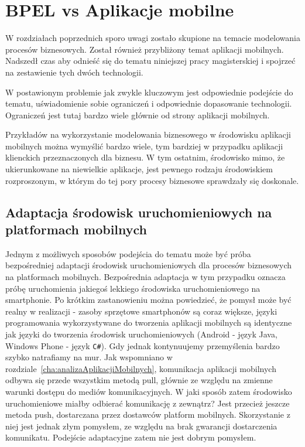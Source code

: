 \chapter{BPEL vs Aplikacje mobilne}
\label{cha:bpelVSmobileApp}

W rozdziałach poprzednich sporo uwagi zostało skupione na temacie modelowania procesów biznesowych. Został również przybliżony temat aplikacji mobilnych. Nadszedł czas aby odnieść się do tematu niniejszej pracy magisterskiej i spojrzeć na zestawienie tych dwóch technologii. 

W postawionym problemie jak zwykle kluczowym jest odpowiednie podejście do tematu, uświadomienie sobie ograniczeń i odpowiednie dopasowanie technologii. Ograniczeń jest tutaj bardzo wiele głównie od strony aplikacji mobilnych.

 Przykładów na wykorzystanie modelowania biznesowego w środowisku aplikacji mobilnych można wymyślić bardzo wiele, tym bardziej w przypadku aplikacji klienckich przeznaczonych dla biznesu. W tym ostatnim, środowisko mimo, że ukierunkowane na niewielkie aplikacje, jest pewnego rodzaju środowiskiem rozproszonym, w którym do tej pory procesy biznesowe sprawdzały się doskonale. 

\section{Adaptacja środowisk uruchomieniowych na platformach mobilnych}
\label{sec:adaptacjaProcesówNaPlatformyMobilne}

Jednym z możliwych sposobów podejścia do tematu może być próba bezpośredniej adaptacji środowisk uruchomieniowych dla procesów biznesowych na platformach mobilnych. Bezpośrednia adaptacja w tym przypadku oznacza próbę uruchomienia jakiegoś lekkiego środowiska uruchomieniowego na smartphonie. Po krótkim zastanowieniu można powiedzieć, że pomysł może być realny w realizacji - zasoby sprzętowe smartphonów są coraz większe, języki programowania wykorzystywane do tworzenia aplikacji mobilnych są identyczne jak języki do tworzenia środowisk uruchomieniowych (Android - język Java, Windows Phone - język \texttt{C\#}). Gdy jednak kontynuujemy przemyślenia bardzo szybko natrafiamy na mur. Jak wspomniano w rozdziale~\ref{cha:analizaAplikacjiMobilnych}, komunikacja aplikacji mobilnych odbywa się przede wszystkim metodą pull, głównie ze względu na zmienne warunki dostępu do mediów komunikacyjnych. W jaki sposób zatem środowisko uruchomieniowe miałby odbierać komunikację z zewnątrz? Jest przecież jeszcze metoda push, dostarczana przez dostawców platform mobilnych. Skorzystanie z niej jest jednak złym pomysłem, ze względu na brak gwarancji dostarczenia komunikatu. Podejście adaptacyjne zatem nie jest dobrym pomysłem. 

